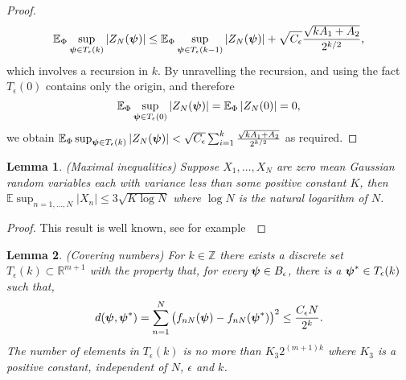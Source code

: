 \documentclass[aap]{imsart}
\newcommand{\reals}{{\mathbb R}}
\newcommand{\ints}{{\mathbb Z}}
\newcommand{\expect}{{\mathbb E}}
\newcommand{\abs}[1]{\left\vert #1 \right\vert}
\newcommand{\sabs}[1]{\vert #1 \vert}
\newtheorem{lemma}{Lemma}
\begin{document}
\begin{proof}
\begin{align*}
\expect_{\Phi} \sup_{\psibf \in T_\epsilon(k) } \sabs{ Z_N(\psibf) } \leq \expect_{\Phi} \sup_{\psibf \in T_\epsilon(k-1)} \sabs{ Z_N(\psibf) }  + \sqrt{C_\epsilon}\frac{\sqrt{  k A_1 + A_2 }}{2^{k/2}},
\end{align*}
which involves a recursion in $k$.  By unravelling the recursion, and using the fact $T_\epsilon(0)$ contains only the origin, and therefore 
\[
\expect_{\Phi}\sup_{\psibf \in T_\epsilon(0)} \abs{ Z_N(\psibf) } = \expect_{\Phi}\abs{ Z_N(0) } = 0,
\]
we obtain $\expect_{\Phi} \sup_{\psibf \in T_\epsilon(k) } \abs{ Z_N(\psibf) } < \sqrt{C_\epsilon} \sum_{i=1}^{k}\frac{\sqrt{  k A_1 + A_2 }}{2^{k/2}}$
as required.
\end{proof}

\begin{lemma}\label{lem:maxineq}(Maximal inequalities)
Suppose $X_1, \dots, X_N$ are zero mean Gaussian random variables each with variance less than some positive constant $K$, then $\expect \sup_{n = 1, \dots, N} \abs{X_n} \leq 3  \sqrt{K \log N}$ where $\log N$ is the natural logarithm of $N$.
\end{lemma}
\begin{proof}
This result is well known, see for example~\cite[Section 3]{Pollard_asymp_empi_proc_1989}  
\end{proof}


\begin{lemma}\label{lem:metricentropy}(Covering numbers)
For $k \in \ints$ there exists a discrete set $T_\epsilon(k) \subset \reals^{m+1}$ with the property that, for every $\boldsymbol{\psi} \in B_\epsilon$, there is a $\boldsymbol{\psi}^* \in T_\epsilon(k)$ such that,
\[
d(\boldsymbol{\psi},\boldsymbol{\psi}^*) = \sum_{n = 1}^N \big( f_{nN}(\boldsymbol{\psi}) - f_{nN}(\boldsymbol{\psi}^*) \big)^2 \leq \frac{C_\epsilon N}{2^k}.
\]
The number of elements in $T_\epsilon(k)$ is no more than $K_3 2^{(m+1)k}$ where $K_3$ is a positive constant, independent of $N$, $\epsilon$ and $k$.
\end{lemma}
\end{document}
